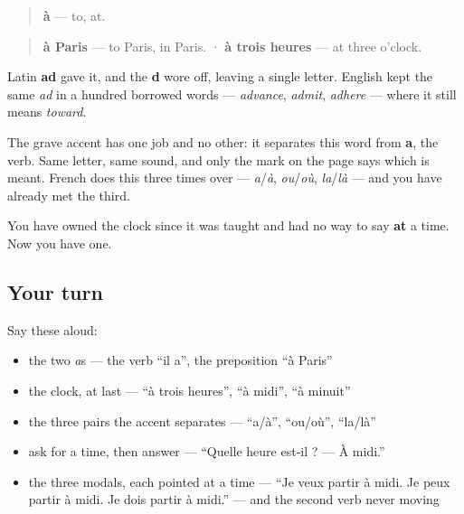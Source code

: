 \begin{cousinweb}
\begin{quote}
\textbf{à} — to, at.
\end{quote}

\begin{quote}
\textbf{à Paris} — to Paris, in Paris. · \textbf{à trois heures} — at three o'clock.
\end{quote}

Latin \textbf{ad} gave it, and the \textbf{d} wore off, leaving a single letter. English kept the same \emph{ad} in a hundred borrowed words — \emph{advance}, \emph{admit}, \emph{adhere} — where it still means \emph{toward}.

The grave accent has one job and no other: it separates this word from \textbf{a}, the verb. Same letter, same sound, and only the mark on the page says which is meant. French does this three times over — \emph{a}/\emph{à}, \emph{ou}/\emph{où}, \emph{la}/\emph{là} — and you have already met the third.

You have owned the clock since it was taught and had no way to say \textbf{at} a time. Now you have one.
\end{cousinweb}

\subsection*{Your turn}
Say these aloud:

\begin{itemize}
\raggedright
  \item the two \emph{a}s — the verb \textquotedblleft{}il a\textquotedblright{}, the preposition \textquotedblleft{}à Paris\textquotedblright{}
  \item the clock, at last — \textquotedblleft{}à trois heures\textquotedblright{}, \textquotedblleft{}à midi\textquotedblright{}, \textquotedblleft{}à minuit\textquotedblright{}
  \item the three pairs the accent separates — \textquotedblleft{}a/à\textquotedblright{}, \textquotedblleft{}ou/où\textquotedblright{}, \textquotedblleft{}la/là\textquotedblright{}
  \item ask for a time, then answer — \textquotedblleft{}Quelle heure est-il ? — À midi.\textquotedblright{}
  \item the three modals, each pointed at a time — \textquotedblleft{}Je veux partir à midi. Je peux partir à midi. Je dois partir à midi.\textquotedblright{} — and the second verb never moving
\end{itemize}

